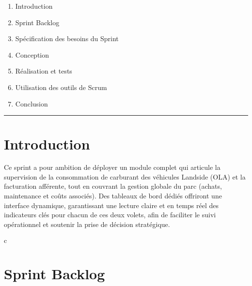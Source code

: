 \documentclass[a4paper,11pt]{report}
\begin{document}
\begin{enumerate}[%
  label=\bfseries\Large\arabic*., 
  leftmargin=2cm, 
  itemsep=1em
]
   \item Introduction
  \item Sprint Backlog
  \item Spécification des besoins du Sprint
  \item Conception
  \item Réalisation et tests
  \item Utilisation des outils de Scrum
  \item Conclusion
\end{enumerate}

\vfill
\begin{center}
  \color{blue!60!black}\rule{0.6\textwidth}{0.8pt}
\end{center}

\newpage
\setcounter{section}{0}

\section{Introduction}
Ce sprint a pour ambition de déployer un module complet qui articule la supervision de la consommation de carburant des véhicules Landside (OLA) et la facturation afférente, tout en couvrant la gestion globale du parc (achats, maintenance et coûts associés). Des tableaux de bord dédiés offriront une interface dynamique, garantissant une lecture claire et en temps réel des indicateurs clés pour chacun de ces deux volets, afin de faciliter le suivi opérationnel et soutenir la prise de décision stratégique.






c
\section{Sprint Backlog}
\end{document}
